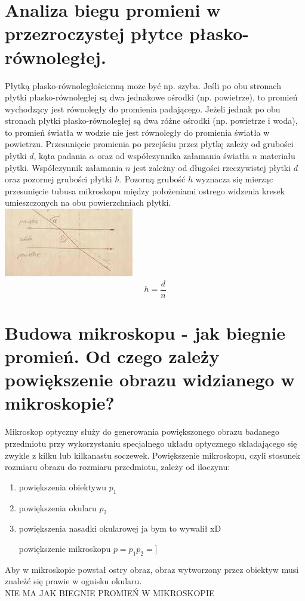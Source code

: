 \documentclass[a4paper,12pt]{scrbook} %
\begin{document}
\section{Analiza biegu promieni w przezroczystej płytce płasko-równoległej.}
Płytką płasko-równoległościenną może być np. szyba. Jeśli po obu stronach płytki płasko-równoległej są dwa jednakowe ośrodki (np. powietrze), to promień wychodzący jest równoległy do promienia padającego. Jeżeli jednak po obu stronach płytki płasko-równoległej są dwa różne ośrodki (np. powietrze i woda), to promień światła w wodzie nie jest równoległy do promienia światła w powietrzu.
Przesunięcie promienia po przejściu przez płytkę zależy od grubości płytki $d$, kąta padania $\alpha$ oraz od współczynnika załamania światła $n$ materiału płytki.
Współczynnik załamania $n$ jest zależny od długości rzeczywistej płytki $d$ oraz pozornej grubości płytki $h$.
Pozorną grubość $h$ wyznacza się mierząc przesunięcie tubusa mikroskopu między położeniami ostrego widzenia kresek umieszczonych na obu powierzchniach płytki.
\\\includegraphics{plytka}
\begin{equation}
h = \frac{d}{n}
\end{equation}
\section{Budowa mikroskopu - jak biegnie promień. Od czego zależy powiększenie obrazu widzianego w mikroskopie?}
Mikroskop optyczny służy do generowania powiększonego obrazu badanego przedmiotu przy wykorzystaniu specjalnego układu optycznego składającego się zwykle z kilku lub kilkanastu soczewek.
Powiększenie mikroskopu, czyli stosunek rozmiaru obrazu do rozmiaru przedmiotu, zależy od iloczynu:
\begin{enumerate}
\item powiększenia obiektywu $p_1$
\item powiększenia okularu $p_2$
\item powiększenia nasadki okularowej ja bym to wywalił xD

powiększenie mikroskopu $p = p_1p_2 = ]$
\end{enumerate}
Aby w mikroskopie powstał ostry obraz, obraz wytworzony przez obiektyw musi znaleźć się prawie w ognisku okularu.\\
{\color{red}NIE MA JAK BIEGNIE PROMIEŃ W MIKROSKOPIE}
\end{document}
